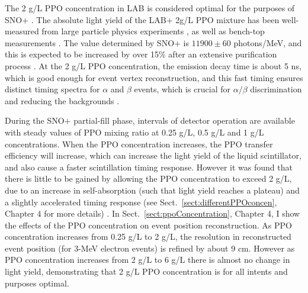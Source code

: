 The 2 g/L PPO concentration in LAB is considered optimal for the purposes of SNO+ \cite{whitepaper}. The absolute light yield of the LAB+ 2g/L PPO mixture has been well-measured from large particle physics experiments \cite{xing2015preliminary,agostini2018comprehensive}, as well as bench-top measurements \cite{xing2015preliminary,kaptanoglu2019cherenkov, novikov}. The value determined by SNO+ is $11900\pm 60$ photons/MeV, and this is expected to be increased by over 15\% after an extensive purification process \cite{snop_jinst,grullon2014light}. At the 2 g/L PPO concentration, the emission decay time is about 5 ns, which is good enough for event vertex reconstruction, and this fast timing ensures distinct timing spectra for $\alpha$ and $\beta$ events, which is crucial for $\alpha/\beta$ discrimination and reducing the backgrounds \cite{snop_jinst}. 

During the SNO+ partial-fill phase, intervals of detector operation are available with steady values of PPO mixing ratio at 0.25 g/L, 0.5 g/L and 1 g/L concentrations. When the PPO concentration increases, the PPO transfer efficiency will increase, which can increase the light yield of the liquid scintillator, and also cause a faster scintillation timing response. However it was found that there is little to be gained by allowing the PPO concentration to exceed 2 g/L, due to an increase in self-absorption (such that light yield reaches a plateau) and a slightly accelerated timing response (see Sect.~\ref{sect:differentPPOconcen}, Chapter 4 for more details) \cite{snop_jinst,collaboration2020development}. In Sect.~\ref{sect:ppoConcentration}, Chapter 4, I show the effects of the PPO concentration on event position reconstruction. As PPO concentration increases from 0.25 g/L to 2 g/L, the resolution in reconstructed event position (for 3-MeV electron events) is refined by about 9 cm. However as PPO concentration increases from 2 g/L to 6 g/L there is almost no change in light yield, demonstrating that 2 g/L PPO concentration is for all intents and purposes optimal.

